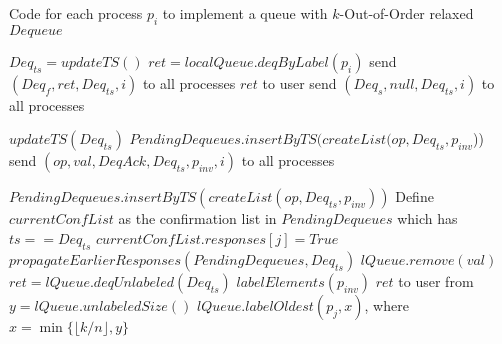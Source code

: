 \documentclass[a4paper,anonymous,USenglish]{lipics-v2021}
\theoremstyle{definition}
\begin{document}
\begin{algorithm}
  \caption{Code for each process $p_i$ to implement a queue with $k$-Out-of-Order relaxed $Dequeue$}\label{alg:relaxed}
  \begin{algorithmic}[1]
      \State $Deq_{ts} = updateTS()$
      \label{oooline:checkFast}
        \State $ret = localQueue.deqByLabel(p_i)$ \label{oooline:fastDeq}
        \State send $(Deq_f, ret, Deq_{ts}, i)$ to all processes
        \State \Return $ret$ to user \label{oooline:fastDeqResponse}
      \Else
        \State send $(Deq_s, null, Deq_{ts}, i)$ to all processes
      \EndIf
    \EndFunction

      \State $updateTS(Deq_{ts})$
        \State $PendingDequeues.insertByTS(createList(op, Deq_{ts}, p_{inv}$))
      \EndIf
      \State send $(op, val, DeqAck, Deq_{ts}, p_{inv}, i)$ to all processes
    \EndFunction

        \State $PendingDequeues.insertByTS(createList(op, Deq_{ts}, p_{inv}))$
      \EndIf
      \State Define $currentConfList$ as the confirmation list in $PendingDequeues$ which has $ts == Deq_{ts}$
      \State $currentConfList.responses[j] = True$
      \State $propagateEarlierResponses(PendingDequeues, Deq_{ts})$ 
        \label{oooline:localExec}
             $lQueue.remove(val)$\EndIf
          \Else    
              \State $ret = lQueue.deqUnlabeled(Deq_{ts})$ \label{oooline:sDeqChooseUnlabeled}
            \State $labelElements(p_{inv})$\label{oooline:label}
              \State \Return $ret$ to user
            \EndIf
          \EndIf 
        \EndIf 
      \EndFor
      \EndFunction
%
       from \cite{TalmageWelch14}
      \State $y = lQueue.unlabeledSize()$
      \State $lQueue.labelOldest(p_j,x)$, where $x = \min\{\lfloor k/n\rfloor, y\}$\label{oooline:labelOldest}
      \EndFunction
  \end{algorithmic}
\end{algorithm}
\end{document}
